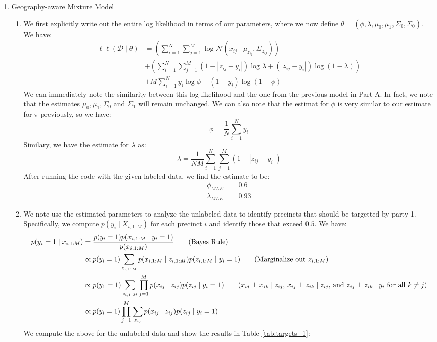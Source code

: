 \documentclass[12pt]{article}
\begin{document}
\begin{enumerate}[label=(\Alph*)]
\begin{enumerate}[label=(\roman*)]
  	\end{enumerate}
  \item Geography-aware Mixture Model
  	\begin{enumerate}[label=(\roman*)]
  		\item We first explicitly write out the entire log likelihood in terms of our parameters, where we now define $\theta = (\phi, \lambda, \mu_0, \mu_1, \Sigma_0, \Sigma_0)$. We have:
  		\begin{align*}
  			\ell\ell(\mathcal{D}\mid \theta) &= \left(\sum_{i=1}^N \sum_{j=1}^M \log \mathcal{N}(x_{ij} \mid \mu_{z_{ij}}, \Sigma_{z_{ij}})\right) \\
  			&+ \left(\sum_{i=1}^N \sum_{j=1}^M (1 - |z_{ij} - y_i|)\log \lambda + (|z_{ij} - y_i|)\log(1 - \lambda) \right) \\
  			&+ M\sum_{i=1}^N y_i \log \phi + (1-y_i)\log (1 -\phi)
  		\end{align*}
  		We can immediately note the similarity between this log-likelihood and the one from the previous model in Part A. In fact, we note that the estimates $\mu_0, \mu_1, \Sigma_0$ and $\Sigma_1$ will remain unchanged. We can also note that the estimat for $\phi$ is very similar to our estimate for $\pi$ previously, so we have:
  		$$
  			\phi = \frac{1}{N}\sum_{i=1}^N y_i
  		$$
  		Similary, we have the estimate for $\lambda$ as:
  		$$
  			\lambda = \frac{1}{NM} \sum_{i=1}^N \sum_{j=1}^M (1 - |z_{ij} - y_i|)
  		$$
  		After running the code with the given labeled data, we find the estimate to be:
  		\begin{align*}
				\phi_{MLE} &= 0.6 \\
				\lambda_{MLE} &= 0.93
  		\end{align*}
  		\item We note use the estimated parameters to analyze the unlabeled data to identify precincts that should be targetted by party 1. Specifically, we compute $p(y_i \mid X_{i, 1:M})$ for each precinct $i$ and identify those that exceed $0.5$. We have:
  		\begin{align*}
  			p(y_i = 1 \mid x_{i, 1:M}) &= \frac{p(y_i = 1)p(x_{i, 1:M} \mid y_i = 1)}{p(x_{i, 1:M})} \tag{Bayes Rule} \\
  			&\propto p(y_i = 1) \sum_{z_{i, 1:M}} p(x_{i,1:M} \mid z_{i, 1:M})p(z_{i, 1:M} \mid y_i = 1) \tag{Marginalize out $z_{i, 1:M}$} \\
  			&\propto p(y_1 = 1) \sum_{z_{i, 1:M}} \prod_{j=1}^M p(x_{ij} \mid z_{ij})p(z_{ij} \mid y_i = 1)  \tag{$x_{ij} \perp x_{ik} \mid z_{ij}$, $x_{ij} \perp z_{ik} \mid z_{ij}$, and $z_{ij} \perp z_{ik} \mid y_i$ for all $k \neq j$} \\
  			&\propto p(y_i = 1)\prod_{j=1}^M \sum_{z_{ij}} p(x_{ij} \mid z_{ij})p(z_{ij} \mid y_i = 1)
  		\end{align*}
  		We compute the above for the unlabeled data and show the results in Table \ref{tab:targets_1}:


\end{enumerate}
\end{enumerate}
\end{document}
